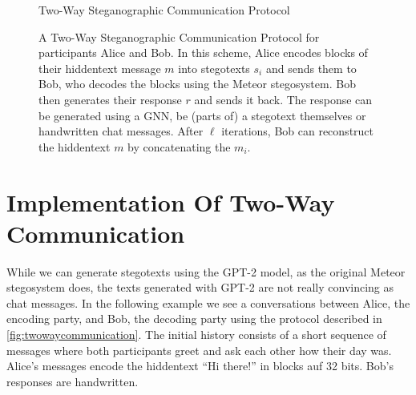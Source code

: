 \begin{figure}[htbp]
	\centering
	\begin{msc}[instance distance=4cm,action width=5cm]{Two-Way Steganographic Communication Protocol}
		\nextlevel[2]
		\nextlevel[3]
		\nextlevel[2]
		\nextlevel[3]
		\nextlevel
		\nextlevel[2]
		\nextlevel[3]
		\nextlevel
		\nextlevel[2]
		\nextlevel[3]
		\nextlevel
	\end{msc}
	\caption{
	A Two-Way Steganographic Communication Protocol for participants Alice and Bob.
	In this scheme, Alice encodes blocks of their hiddentext message $m$ into stegotexts $s_i$ and sends them to Bob, who decodes the blocks using the Meteor stegosystem.
	Bob then generates their response $r$ and sends it back.
	The response can be generated using a GNN, be (parts of) a stegotext themselves or handwritten chat messages.
	After $\ell$ iterations, Bob can reconstruct the hiddentext $m$ by concatenating the $m_i$.
	}
	\label{fig:twowaycommunication}
\end{figure}

\section{Implementation Of Two-Way Communication}
While we can generate stegotexts using the GPT-2 model, as the original Meteor stegosystem does, the texts generated with GPT-2 are not really convincing as chat messages. 
In the following example we see a conversations between Alice, the encoding party, and Bob, the decoding party using the protocol described in \autoref{fig:twowaycommunication}.
The initial history consists of a short sequence of messages where both participants greet and ask each other how their day was.
Alice's messages encode the hiddentext ``Hi there!'' in blocks auf 32 bits. 
Bob's responses are handwritten.

